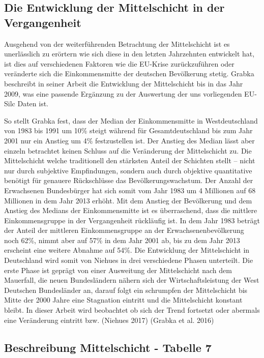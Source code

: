 \documentclass[12pt,]{article}
\begin{document}
\subsection{Die Entwicklung der Mittelschicht in der
Vergangenheit}\label{die-entwicklung-der-mittelschicht-in-der-vergangenheit}

Ausgehend von der weiterführenden Betrachtung der Mittelschicht ist es
unerlässlich zu erörtern wie sich diese in den letzten Jahrzehnten
entwickelt hat, ist dies auf verschiedenen Faktoren wie die EU-Krise
zurückzuführen oder veränderte sich die Einkommensmitte der deutschen
Bevölkerung stetig. Grabka beschreibt in seiner Arbeit die Entwicklung
der Mittelschicht bis in das Jahr 2009, was eine passende Ergänzung zu
der Auswertung der uns vorliegenden EU-Silc Daten ist.

So stellt Grabka fest, dass der Median der Einkommensmitte in
Westdeutschland von 1983 bis 1991 um 10\% steigt während für
Gesamtdeutschland bis zum Jahr 2001 nur ein Anstieg um 4\% festzustellen
ist. Der Anstieg des Median lässt aber einzeln betrachtet keinen Schluss
auf die Veränderung der Mittelschicht zu. Die Mittelschicht welche
traditionell den stärksten Anteil der Schichten stellt -- nicht nur
durch subjektive Empfindungen, sondern auch durch objektive quantitative
benötigt für genauere Rückschlüsse das Bevölkerungswachstum. Der Anzahl
der Erwachsenen Bundesbürger hat sich somit vom Jahr 1983 um 4 Millionen
auf 68 Millionen in dem Jahr 2013 erhöht. Mit dem Anstieg der
Bevölkerung und dem Anstieg des Medians der Einkommensmitte ist es
überraschend, dass die mittlere Einkommensgruppe in der Vergangenheit
rückläufig ist. In dem Jahr 1983 beträgt der Anteil der mittleren
Einkommensgruppe an der Erwachsenenbevölkerung noch 62\%, nimmt aber auf
57\% in dem Jahr 2001 ab, bis zu dem Jahr 2013 erscheint eine weitere
Abnahme auf 54\%. Die Entwicklung der Mittelschicht in Deutschland wird
somit von Niehues in drei verschiedene Phasen unterteilt. Die erste
Phase ist geprägt von einer Ausweitung der Mittelschicht nach dem
Mauerfall, die neuen Bundesländern nähern sich der Wirtschaftsleistung
der West Deutschen Bundesländer an, darauf folgt ein schrumpfen der
Mittelschicht bis Mitte der 2000 Jahre eine Stagnation eintritt und die
Mittelschicht konstant bleibt. In dieser Arbeit wird beobachtet ob sich
der Trend fortsetzt oder abermals eine Veränderung eintritt bzw.
(Niehues 2017) (Grabka et al. 2016)

\subsection{Beschreibung Mittelschicht - Tabelle
7}\label{beschreibung-mittelschicht---tabelle-7}
\end{document}
